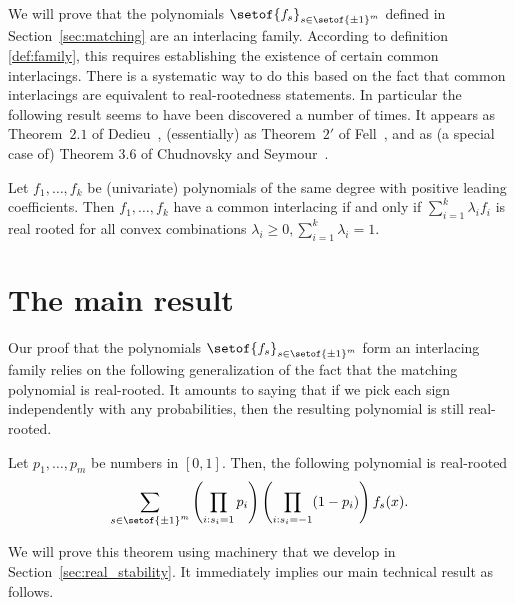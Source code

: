 \documentclass[11pt]{article}
\begin{document}
We will prove that the polynomials $\setof{f_{s}}_{s \in \setof{\pm 1}^{m}}$ defined in Section~\ref{sec:matching} are an interlacing family.
According to definition \ref{def:family}, this requires establishing the
  existence of certain common interlacings.
There is a systematic way to do this based on the fact that common interlacings
  are equivalent to real-rootedness statements.
In particular the following result seems to have been discovered a number of times.
It appears as Theorem~$2.1$ of Dedieu~\cite{Dedieu}, (essentially) as
Theorem~$2'$ of Fell~\cite{Fell}, and as (a special case of) Theorem 3.6 of Chudnovsky and
Seymour~\cite{ChudnovskySeymour}.

\begin{lemma}\label{lem:Fisk}
Let $f_1,\ldots, f_k$ be (univariate) polynomials of the same degree with
positive leading coefficients. Then $f_1,\ldots, f_k$ have a common interlacing if
and only if $\sum_{i=1}^k\lambda_i f_i$ is real rooted for all convex
combinations $\lambda_i\ge 0, \sum_{i=1}^k\lambda_i=1$.
\end{lemma}




\section{The main result}\label{sec:main}

Our proof that the polynomials $\setof{f_{s}}_{s \in \setof{\pm 1}^{m}}$ form an interlacing family
  relies on the following generalization of the fact that the 
  matching polynomial is real-rooted.
It amounts to saying that if we pick each sign independently
  with any probabilities,
  then the resulting polynomial is still real-rooted.

\begin{theorem}\label{thm:skewMatchingPolynomial}
Let $p_{1}, \dotsc , p_{m}$ be numbers in $[0,1]$.
Then, the following polynomial is real-rooted
\[
  \sum_{s \in \setof{\pm 1}^{m}} 
  \left(\prod_{i : s_{i} = 1} p_{i} \right)
  \left(\prod_{i : s_{i} = -1} (1 - p_{i}) \right) 
  f_{s} (x).
\]
\end{theorem}


We will prove this theorem using machinery that we develop in Section~\ref{sec:real_stability}. 
It immediately implies our main technical result as follows.
\end{document}
